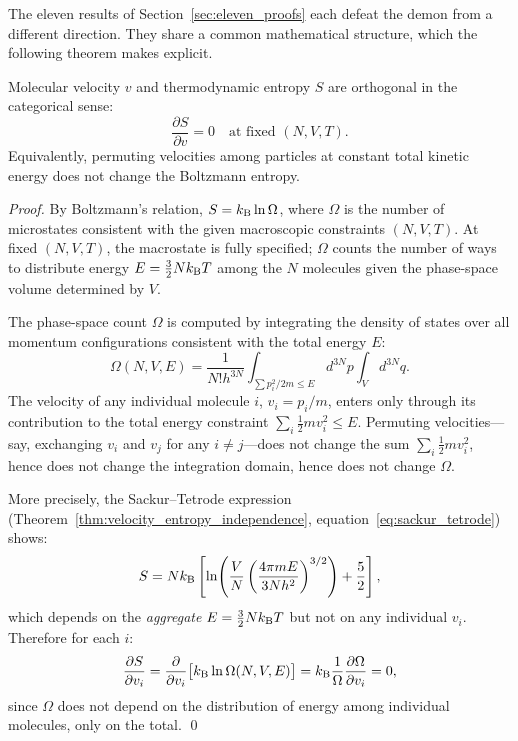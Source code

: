 The eleven results of Section~\ref{sec:eleven_proofs} each defeat the demon
from a different direction. They share a common mathematical structure, which
the following theorem makes explicit.

\begin{theorem}
\label{thm:categorical_kinetic_orthogonality}
Molecular velocity $v$ and thermodynamic entropy $S$ are orthogonal in the
categorical sense:
\begin{equation}
  \frac{\partial S}{\partial v} = 0 \quad \text{at fixed } (N, V, T).
  \label{eq:cat_kin_orthogonality}
\end{equation}
Equivalently, permuting velocities among particles at constant total kinetic
energy does not change the Boltzmann entropy.
\end{theorem}

\begin{proof}
By Boltzmann's relation, $S = k_{\mathrm{B}} \ln \Omega$, where $\Omega$ is the number
of microstates consistent with the given macroscopic constraints $(N, V, T)$.
At fixed $(N, V, T)$, the macrostate is fully specified; $\Omega$ counts
the number of ways to distribute energy $E = \frac{3}{2}Nk_{\mathrm{B}} T$ among the
$N$ molecules given the phase-space volume determined by $V$.

The phase-space count $\Omega$ is computed by integrating the density of
states over all momentum configurations consistent with the total energy $E$:
\begin{equation}
  \Omega(N, V, E) = \frac{1}{N! h^{3N}} \int_{\sum p_i^2 / 2m \leq E} d^{3N}p \int_V d^{3N}q.
\end{equation}
The velocity of any individual molecule $i$, $v_i = p_i / m$, enters only
through its contribution to the total energy constraint
$\sum_i \frac{1}{2}mv_i^2 \leq E$. Permuting velocities---say, exchanging
$v_i$ and $v_j$ for any $i \neq j$---does not change the sum
$\sum_i \frac{1}{2}mv_i^2$, hence does not change the integration domain,
hence does not change $\Omega$.

More precisely, the Sackur--Tetrode expression (Theorem~\ref{thm:velocity_entropy_independence},
equation~\eqref{eq:sackur_tetrode}) shows:
\begin{equation}
  S = Nk_{\mathrm{B}} \left[\ln\!\left(\frac{V}{N}\left(\frac{4\pi m E}{3Nh^2}\right)^{3/2}\right)
      + \frac{5}{2}\right],
\end{equation}
which depends on the \emph{aggregate} $E = \frac{3}{2}Nk_{\mathrm{B}} T$ but not on
any individual $v_i$. Therefore for each $i$:
\begin{equation}
  \frac{\partial S}{\partial v_i} = \frac{\partial}{\partial v_i}\bigl[k_{\mathrm{B}} \ln \Omega(N,V,E)\bigr]
  = k_{\mathrm{B}} \frac{1}{\Omega}\frac{\partial \Omega}{\partial v_i} = 0,
\end{equation}
since $\Omega$ does not depend on the distribution of energy among individual
molecules, only on the total. \qed
\end{proof}

